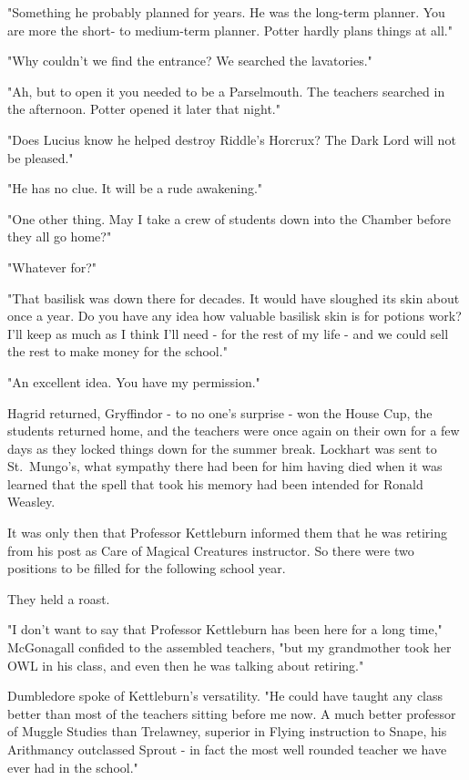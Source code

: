 "Something he probably planned for years. He was the long-term planner. You are more the short- to medium-term planner. Potter hardly plans things at all."

"Why couldn't we find the entrance? We searched the lavatories."

"Ah, but to open it you needed to be a Parselmouth. The teachers searched in the afternoon. Potter opened it later that night."

"Does Lucius know he helped destroy Riddle's Horcrux? The Dark Lord will not be pleased."

"He has no clue. It will be a rude awakening."

"One other thing. May I take a crew of students down into the Chamber before they all go home?"

"Whatever for?"

"That basilisk was down there for decades. It would have sloughed its skin about once a year. Do you have any idea how valuable basilisk skin is for potions work? I'll keep as much as I think I'll need - for the rest of my life - and we could sell the rest to make money for the school."

"An excellent idea. You have my permission."

Hagrid returned, Gryffindor - to no one's surprise - won the House Cup, the students returned home, and the teachers were once again on their own for a few days as they locked things down for the summer break. Lockhart was sent to St.~Mungo's, what sympathy there had been for him having died when it was learned that the spell that took his memory had been intended for Ronald Weasley.

It was only then that Professor Kettleburn informed them that he was retiring from his post as Care of Magical Creatures instructor. So there were two positions to be filled for the following school year.

They held a roast.

"I don't want to say that Professor Kettleburn has been here for a long time," McGonagall confided to the assembled teachers, "but my grandmother took her OWL in his class, and even then he was talking about retiring."

Dumbledore spoke of Kettleburn's versatility. "He could have taught any class better than most of the teachers sitting before me now. A much better professor of Muggle Studies than Trelawney, superior in Flying instruction to Snape, his Arithmancy outclassed Sprout - in fact the most well rounded teacher we have ever had in the school."

